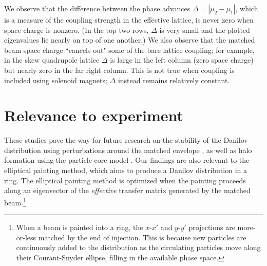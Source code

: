 %
We observe that the difference between the phase advances $\Delta = |\mu_2 - \mu_1|$, which is a measure of the coupling strength in the effective lattice, is never zero when space charge is nonzero. (In the top two rows, $\Delta$ is very small and the plotted eigenvalues lie nearly on top of one another.) We also observe that the matched beam space charge ``cancels out" some of the bare lattice coupling; for example, in the skew quadrupole lattice $\Delta$ is large in the left column (zero space charge) but nearly zero in the far right column. This is not true when coupling is included using solenoid magnets; $\Delta$ instead remains relatively constant.  


\section{Relevance to experiment}

These studies pave the way for future research on the stability of the Danilov distribution using perturbations around the matched envelope \cite{Goswami2016}, as well as halo formation using the particle-core model \cite{Wangler1998, Gluckstern1994, Gluckstern1998}. Our findings are also relevant to the elliptical painting method, which aims to produce a Danilov distribution in a ring. The elliptical painting method is optimized when the painting proceeds along an eigenvector of the \textit{effective} transfer matrix generated by the matched beam.\footnote{When a beam is painted into a ring, the $x$-$x'$ and $y$-$y'$ projections are more-or-less matched by the end of injection. This is because new particles are continuously added to the distribution as the circulating particles move along their Courant-Snyder ellipse, filling in the available phase space.}
%

